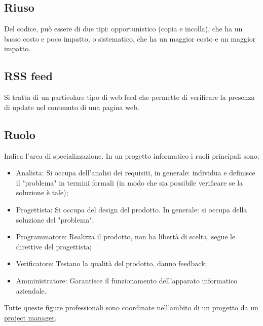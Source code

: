 	\subsection{Riuso}
	\label{sec:riuso}
	Del codice, può essere di due tipi: opportunistico (copia e incolla), che ha un basso costo e poco impatto, o sistematico, che ha un maggior costo e un maggior impatto.

	\subsection{RSS feed}
	\label{sec:rssfeed}
	Si tratta di un particolare tipo di web feed che permette di verificare la presenza di update nel contenuto di una pagina web. 

	\subsection{Ruolo}
	\label{sec:ruolo}
	Indica l'area di specializzazione.
	In un progetto informatico i ruoli principali sono:
	\begin{itemize}
	\item Analista: Si occupa dell'analisi dei requisiti, in generale: individua e definisce il "problema" in termini formali (in modo che sia possibile verificare se la soluzione è tale);
	\item Progettista: Si occupa del design del prodotto. In generale: si occupa della soluzione del "problema";
	\item Programmatore: Realizza il prodotto, non ha libertà di scelta, segue le direttive del progettista;
	\item Verificatore: Testano la qualità del prodotto, danno feedback;
	\item Amministratore: Garantisce il funzionamento dell'apparato informatico aziendale.
	\end{itemize}
	Tutte queste figure professionali sono coordinate nell'ambito di un progetto da un \underline{\hyperref[sec:projectmanager]{project manager}}.
	\newpage


